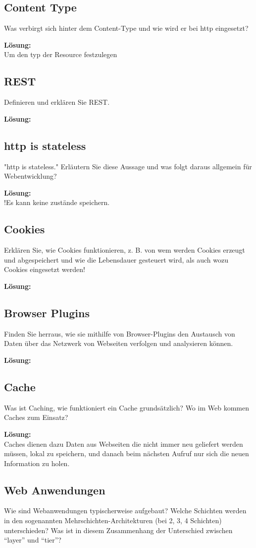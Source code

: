 \documentclass[11pt,a4paper,DIV=12]{scrartcl}
\newcommand{\loesung}{\textbf{Lösung:}\\}
\begin{document}
\subsection{Content Type}
Was verbirgt sich hinter dem Content-Type und wie wird er bei http eingesetzt?

\loesung
Um den typ der Resource festzulegen
\subsection{REST}
Definieren und erklären Sie REST.

\loesung

\subsection{http is stateless}
"http is stateless." Erläutern Sie diese Aussage und was folgt daraus allgemein für Webentwicklung?

\loesung
!Es kann keine zustände speichern.
\subsection{Cookies}
Erklären Sie, wie Cookies funktionieren, z. B. von wem werden Cookies erzeugt und abgespeichert und wie die Lebensdauer gesteuert wird, als auch wozu Cookies eingesetzt werden!

\loesung

\subsection{Browser Plugins}
Finden Sie herraus, wie sie mithilfe von Browser-Plugins den Austausch von Daten über das Netzwerk von Webseiten verfolgen und analysieren können.

\loesung

\subsection{Cache}
Was ist Caching, wie funktioniert ein Cache grundsätzlich? Wo im Web kommen Caches zum Einsatz?

\loesung
Caches dienen dazu Daten aus Webseiten die nicht immer neu geliefert werden müssen, lokal zu speichern, und danach beim nächsten Aufruf nur sich die neuen Information zu holen.
\subsection{Web Anwendungen}
Wie sind Webanwendungen typischerweise aufgebaut? Welche Schichten werden in den sogenannten Mehrschichten-Architekturen (bei 2, 3, 4 Schichten) unterschieden? Was ist in diesem Zusammenhang der Unterschied zwischen \enquote{layer} und \enquote{tier}?
\end{document}
